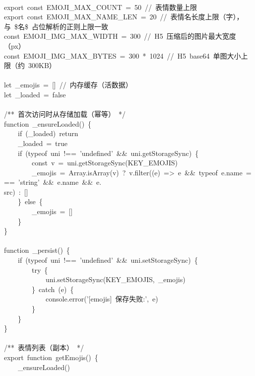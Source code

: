 \documentclass[a4paper,10pt]{article}
\begin{document}
{\ttfamily\footnotesize\raggedright
\mbox{}\\
export~const~EMOJI\_MAX\_COUNT~=~50~//~表情数量上限\\
export~const~EMOJI\_MAX\_NAME\_LEN~=~20~//~表情名长度上限（字），与~\$名\$~占位解析的正则上限一致\\
const~EMOJI\_IMG\_MAX\_WIDTH~=~300~//~H5~压缩后的图片最大宽度（px）\\
const~EMOJI\_IMG\_MAX\_BYTES~=~300~*~1024~//~H5~base64~单图大小上限（约~300KB）\\
\mbox{}\\
let~\_emojis~=~[]~//~内存缓存（活数据）\\
let~\_loaded~=~false\\
\mbox{}\\
/**~首次访问时从存储加载（幂等）~*/\\
function~\_ensureLoaded()~\{\\
~~~~if~(\_loaded)~return\\
~~~~\_loaded~=~true\\
~~~~if~(typeof~uni~!==~'undefined'~\&\&~uni.getStorageSync)~\{\\
~~~~~~~~const~v~=~uni.getStorageSync(KEY\_EMOJIS)\\
~~~~~~~~\_emojis~=~Array.isArray(v)~?~v.filter((e)~=>~e~\&\&~typeof~e.name~===~'string'~\&\&~e.name~\&\&~e.\\
src)~:~[]\\
~~~~\}~else~\{\\
~~~~~~~~\_emojis~=~[]\\
~~~~\}\\
\}\\
\mbox{}\\
function~\_persist()~\{\\
~~~~if~(typeof~uni~!==~'undefined'~\&\&~uni.setStorageSync)~\{\\
~~~~~~~~try~\{\\
~~~~~~~~~~~~uni.setStorageSync(KEY\_EMOJIS,~\_emojis)\\
~~~~~~~~\}~catch~(e)~\{\\
~~~~~~~~~~~~console.error('[emojis]~保存失败:',~e)\\
~~~~~~~~\}\\
~~~~\}\\
\}\\
\mbox{}\\
/**~表情列表（副本）~*/\\
export~function~getEmojis()~\{\\
~~~~\_ensureLoaded()\\
}
\end{document}
